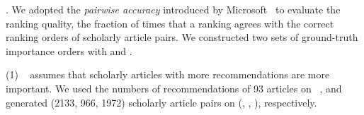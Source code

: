 
.
We adopted the {\em pairwise accuracy} introduced by Microsoft~\cite{Richardson06:BPR,wsdmcup} to evaluate the ranking quality, \ie the fraction of times that a ranking agrees with the correct ranking orders of scholarly article pairs. We constructed two sets of ground-truth importance orders with \recom and \fcita.
%

\noindent
(1) \recom~\cite{Liang16AAAI} assumes that scholarly articles with more recommendations are more important.
We used the numbers of recommendations of 93 articles on \aan~\cite{Liang16AAAI}, %
and %
generated (2133, 966, 1972) scholarly article pairs on (\aan, \aminer, \magdata), respectively.


